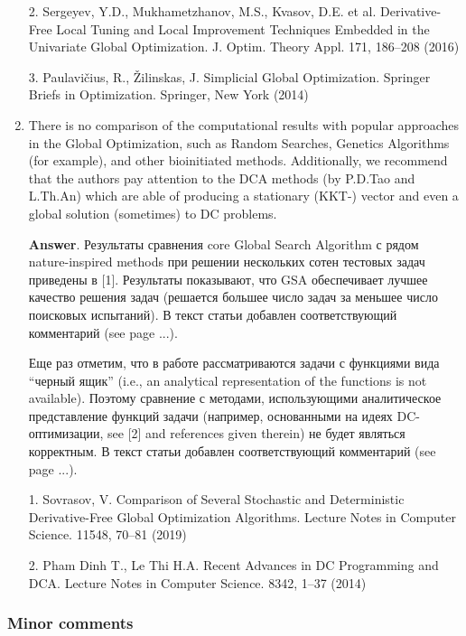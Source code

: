\documentclass{article}%
\begin{document}
\begin{enumerate}
2. Sergeyev, Y.D., Mukhametzhanov, M.S., Kvasov, D.E. et al. Derivative-Free Local Tuning and Local Improvement Techniques Embedded in the Univariate Global Optimization. J. Optim. Theory Appl. 171, 186--208 (2016)

3. Paulavi{\v c}ius, R., {\v Z}ilinskas, J. Simplicial Global Optimization. Springer Briefs in Optimization. Springer, New York (2014)


\item There is no comparison of the computational results with popular approaches in the Global Optimization, such as Random Searches, Genetics Algorithms (for example), and other bioinitiated methods.
Additionally, we recommend that the authors pay attention to the DCA methods (by P.D.Tao and L.Th.An) which are able of producing a stationary (KKT-) vector and even a global solution (sometimes) to DC problems.

\textbf{Answer}.
Результаты сравнения core Global Search Algorithm с рядом nature-inspired methods при решении нескольких сотен тестовых задач приведены в [1]. Результаты показывают, что GSA обеспечивает лучшее качество решения задач (решается большее число задач за меньшее число поисковых испытаний). В текст статьи добавлен соответствующий комментарий (see page ...).

Еще раз отметим, что в работе рассматриваются задачи с функциями вида ``черный ящик'' (i.e., an analytical representation of the functions is not available). Поэтому сравнение с методами, использующими аналитическое представление функций задачи (например, основанными на идеях DC-оптимизации, see [2] and references given therein) не будет являться корректным. В текст статьи добавлен соответствующий комментарий (see page ...).

1. Sovrasov, V.  Comparison of Several Stochastic and Deterministic Derivative-Free Global Optimization Algorithms.  Lecture Notes in Computer Science. 11548, 70--81 (2019)

2. Pham Dinh T., Le Thi H.A. Recent Advances in DC Programming and DCA. Lecture Notes in Computer Science. 8342, 1--37 (2014)

\end{enumerate}


\subsubsection*{Minor comments}
\end{document}
